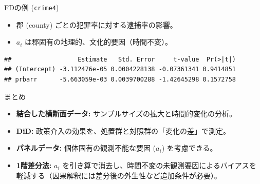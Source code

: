 \documentclass[
  ignorenonframetext,
]{beamer}
\newenvironment{Shaded}{\begin{snugshade}}{\end{snugshade}}
\newcommand{\AttributeTok}[1]{\textcolor[rgb]{0.13,0.29,0.53}{#1}}
\newcommand{\CommentTok}[1]{\textcolor[rgb]{0.56,0.35,0.01}{\textit{#1}}}
\newcommand{\DecValTok}[1]{\textcolor[rgb]{0.00,0.00,0.81}{#1}}
\newcommand{\FunctionTok}[1]{\textcolor[rgb]{0.13,0.29,0.53}{\textbf{#1}}}
\newcommand{\NormalTok}[1]{#1}
\newcommand{\OtherTok}[1]{\textcolor[rgb]{0.56,0.35,0.01}{#1}}
\newcommand{\SpecialCharTok}[1]{\textcolor[rgb]{0.81,0.36,0.00}{\textbf{#1}}}
\newcommand{\StringTok}[1]{\textcolor[rgb]{0.31,0.60,0.02}{#1}}
\providecommand{\tightlist}{%
  \setlength{\itemsep}{0pt}\setlength{\parskip}{0pt}}
\begin{document}
\begin{frame}[fragile]{FDの例 (\texttt{crime4})}
\label{fdux306eux4f8b-crime4}
\begin{itemize}
\tightlist
\item
  郡 (county) ごとの犯罪率に対する逮捕率の影響。
\item
  \(a_i\) は郡固有の地理的、文化的要因（時間不変）。
\end{itemize}

\footnotesize

\begin{Shaded}
\end{Shaded}

\begin{verbatim}
##                  Estimate   Std. Error     t-value  Pr(>|t|)
## (Intercept) -3.112476e-05 0.0004228138 -0.07361341 0.9414851
## prbarr      -5.663059e-03 0.0039700288 -1.42645298 0.1572758
\end{verbatim}

\normalsize
\end{frame}

\begin{frame}{まとめ}
\label{ux307eux3068ux3081}
\begin{itemize}
\tightlist
\item
  \textbf{結合した横断面データ:}
  サンプルサイズの拡大と時間的変化の分析。
\item
  \textbf{DiD:} 政策介入の効果を、処置群と対照群の「変化の差」で測定。
\item
  \textbf{パネルデータ:} 個体固有の観測不能な要因 (\(a_i\))
  を考慮できる。
\item
  \textbf{1階差分法:} \(a_i\)
  を引き算で消去し、時間不変の未観測要因によるバイアスを軽減する（因果解釈には差分後の外生性など追加条件が必要）。
\end{itemize}
\end{frame}
\end{document}
